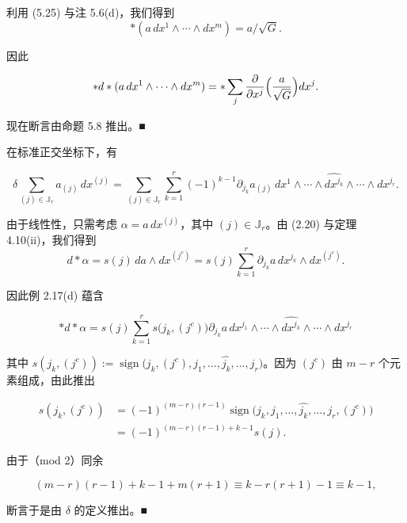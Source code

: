 \begin{example}
\begin{items}
\proofhead
利用 (5.25) 与注 5.6(d)，我们得到
\[
\ast(a\,dx^{1} \wedge \cdots \wedge dx^{m}) = a/\sqrt{G} .
\]

因此

\[
\ast d\ast(a\,dx^{1} \wedge \cdots \wedge dx^{m}) = \ast\sum_{j}\frac{\partial}{\partial x^{j}}\Bigl(\frac{a}{\sqrt{G}}\Bigr)dx^{j} .
\]

现在断言由命题 5.8 推出。\nobreak\hspace{0.35em}■

\item

在标准正交坐标下，有

\[
\delta\sum_{(j)\in\mathbb{J}_{r}}a_{(j)}\,dx^{(j)} = \sum_{(j)\in\mathbb{J}_{r}}\sum_{k=1}^{r}(-1)^{k-1}\partial_{j_{k}}a_{(j)}\,dx^{1} \wedge \cdots \wedge \widehat{dx^{j_{k}}} \wedge \cdots \wedge dx^{j_{r}} .
\]

\proofhead
由于线性性，只需考虑 $ \alpha = a\,dx^{(j)} $，其中 $ (j) \in \mathbb{J}_{r} $。由 (2.20) 与定理 4.10(ii)，我们得到
\[
d\ast\alpha = s(j)\,da \wedge dx^{(j^{c})} = s(j)\sum_{k=1}^{r}\partial_{j_{k}}a\,dx^{j_{k}} \wedge dx^{(j^{c})} .
\]

因此例 2.17(d) 蕴含

\[
\ast d\ast\alpha = s(j)\sum_{k=1}^{r}s\bigl(j_{k},(j^{c})\bigr)\partial_{j_{k}}a\,dx^{j_{1}} \wedge \cdots \wedge \widehat{dx^{j_{k}}} \wedge \cdots \wedge dx^{j_{r}}
\]

其中 $ s(j_{k},(j^{c})) := \operatorname{sign}\bigl(j_{k},(j^{c}),j_{1},\ldots,\widehat{j_{k}},\ldots,j_{r}\bigr) $。因为 $ (j^{c}) $ 由 $ m-r $ 个元素组成，由此推出

\begin{equation*}
\begin{aligned}
s(j_{k},(j^{c})) &= (-1)^{(m-r)(r-1)}\operatorname{sign}\bigl(j_{k},j_{1},\ldots,\widehat{j_{k}},\ldots,j_{r},(j^{c})\bigr) \\ &= (-1)^{(m-r)(r-1)+k-1}s(j) .
\end{aligned}
\end{equation*}

由于（mod 2）同余

\[
(m-r)(r-1)+k-1+m(r+1) \equiv k-r(r+1)-1 \equiv k-1 ,
\]

断言于是由 $ \delta $ 的定义推出。\nobreak\hspace{0.35em}■

\end{items}

\end{example}

